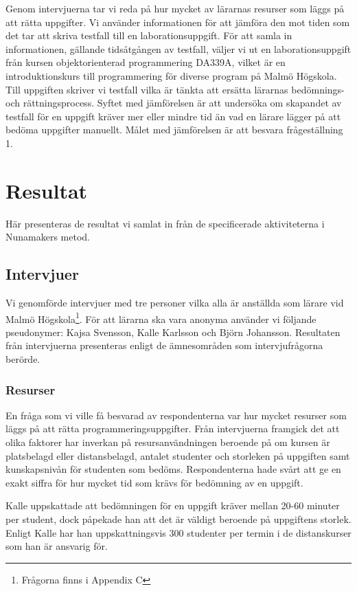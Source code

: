 \documentclass[a4paper,11pt]{article}
\begin{document}
{Genom intervjuerna tar vi reda på hur mycket av lärarnas resurser som läggs på att rätta uppgifter. Vi använder informationen för att jämföra den mot tiden som det tar att skriva testfall till en laborationsuppgift. För att samla in informationen, gällande tidsåtgången av testfall, väljer vi ut en laborationsuppgift från kursen objektorienterad programmering DA339A, vilket är en introduktionskurs till programmering för diverse program på Malmö Högskola. Till uppgiften skriver vi testfall vilka är tänkta att ersätta lärarnas bedömnings- och rättningsprocess. Syftet med jämförelsen är att undersöka om skapandet av testfall för en uppgift kräver mer eller mindre tid än vad en lärare lägger på att bedöma uppgifter manuellt. Målet med jämförelsen är att besvara frågeställning 1.

\newpage
\section{Resultat}
Här presenteras de resultat vi samlat in från de specificerade aktiviteterna i Nunamakers metod. 

\subsection{Intervjuer}
Vi genomförde intervjuer med tre personer vilka alla är anställda som lärare vid Malmö Högskola\footnote{Frågorna finns i Appendix C}. För att lärarna ska vara anonyma använder vi följande pseudonymer: Kajsa Svensson, Kalle Karlsson och Björn Johansson. Resultaten från intervjuerna presenteras enligt de ämnesområden som intervjufrågorna berörde.

\subsubsection{Resurser}

En fråga som vi ville få besvarad av respondenterna var hur mycket resurser som läggs på att rätta programmeringsuppgifter. Från intervjuerna framgick det att olika faktorer har inverkan på resursanvändningen beroende på om kursen är platsbelagd eller distansbelagd, antalet studenter och storleken på uppgiften samt kunskapsnivån för studenten som bedöms. Respondenterna hade svårt att ge en exakt siffra för hur mycket tid som krävs för bedömning av en uppgift. 

Kalle uppskattade att bedömningen för en uppgift kräver mellan 20-60 minuter per student, dock påpekade han att det är väldigt beroende på uppgiftens storlek. Enligt Kalle har han uppskattningsvis 300 studenter per termin i de distanskurser som han är ansvarig för.

}
\end{document}
